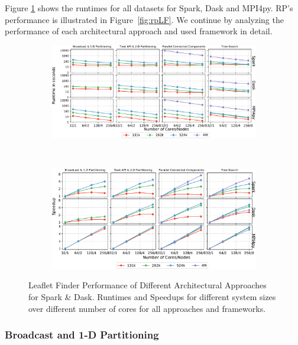 Figure \ref{fig:All4approachesNoRp} shows the runtimes for all datasets for
Spark, Dask and MPI4py. RP's performance is illustrated in
Figure~\ref{fig:rpLF}. We continue by analyzing the performance of each
architectural approach and used framework in detail.

\begin{figure}[t]
    \centering
    \begin{subfigure}{.85\textwidth}
        \centering
        \includegraphics[width=.95\linewidth]{figures/data_analytics_hpc/task_par/All4approachesWith4M_logscaleline.pdf}
    \end{subfigure}\\
    \begin{subfigure}{.85\textwidth}
        \centering
        \includegraphics[width=.95\linewidth]{figures/data_analytics_hpc/task_par/All4approachesWith4MSpeedup.pdf}
    \end{subfigure}
    \caption{Leaflet Finder Performance of Different Architectural Approaches
            for Spark \& Dask. Runtimes and Speedups for different system sizes
            over different number of cores for all approaches and frameworks.}
    \label{fig:All4approachesNoRp}
\end{figure}

\subsubsection*{Broadcast and 1-D Partitioning}

